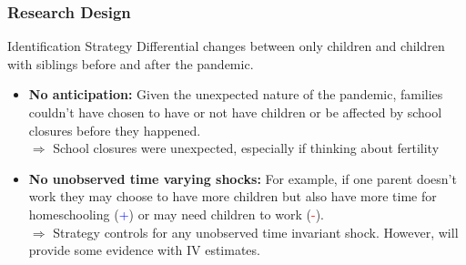 \documentclass{beamer}
\begin{document}
\begin{frame}
    \label{frame:research}
    \frametitle{Research Design}
    
    \begin{block}{Identification Strategy}
    Differential changes between only children and children with siblings before and after the pandemic.
    \end{block}
    
    \begin{itemize}
         \item<2-> \textbf{No anticipation:} Given the unexpected nature of the pandemic, families couldn't have chosen to have or not have children or be affected by school closures before they happened. \\
         $\Rightarrow$ School closures were unexpected, especially if thinking about fertility
         \item<3-> \textbf{No unobserved time varying shocks:} For example, if one parent doesn't work they may choose to have more children but also have more time for homeschooling (\textcolor{blue}{+}) or may need children to work (\textcolor{red}{-}). \\
         $\Rightarrow$ Strategy controls for any unobserved time invariant shock. However, will provide some evidence with IV estimates.
    \end{itemize}

\end{frame}
\end{document}
